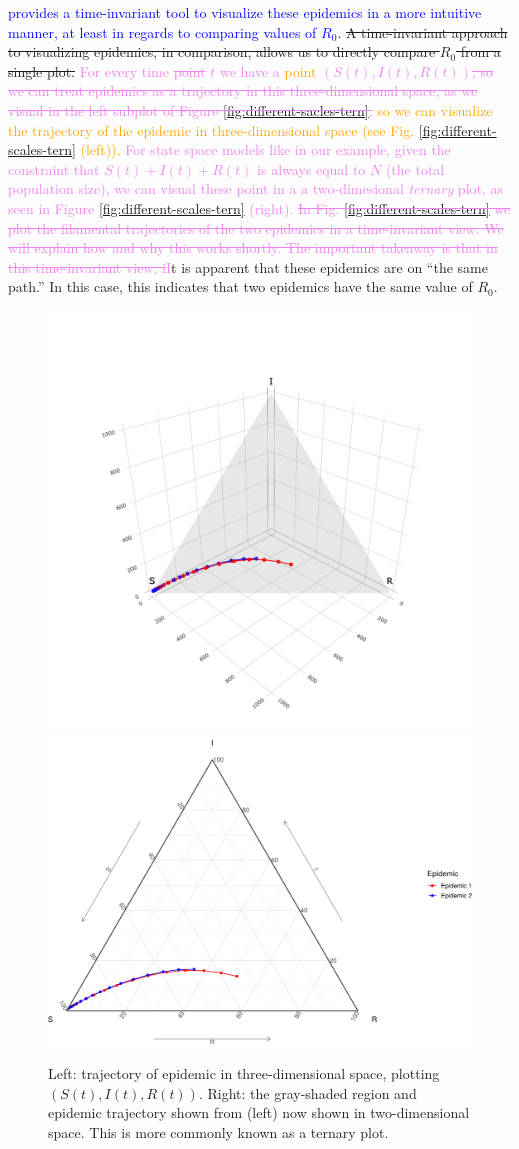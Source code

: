 \documentclass[
  shortnames]{jss}
\begin{document}
\textcolor{blue}{ provides a time-invariant tool to visualize these epidemics in a more intuitive manner, at least in regards to comparing values of $R_0$.}
\sout{A time-invariant approach to visualizing epidemics, in comparison, allows us to directly compare $R_0$ from a single plot.}
\textcolor{violet}{For every time \sout{point} $t$ we have a \textcolor{orange}{point} $(S(t),I(t), R(t))$\sout{, so we can treat epidemics as a trajectory in this three-dimensional space, as we visual in the left subplot of Figure \ref{fig:different-sacles-tern}.} \textcolor{orange}{so we can visualize the trajectory of the epidemic in three-dimensional space (see Fig. \ref{fig:different-scales-tern} (left)).} For state space models like in our example, given the constraint that $S(t) + I(t)+R(t)$ is always equal to $N$ (the total population size), we can visual these point in a a two-dimesional \textit{ternary} plot, as seen in Figure \ref{fig:different-scales-tern} (right). \sout{In Fig. \ref{fig:different-scales-tern}
we plot the filamental trajectories of the two epidemics in a time-invariant view. We will explain how and why this works shortly. The important takeaway is that in this time-invariant view, i}I}t
is apparent that these epidemics are on ``the same path.'' In this case,
this indicates that two epidemics have the same value of \(R_0\).

\begin{CodeChunk}
\begin{figure}[H]

{\centering \includegraphics[width=0.49\linewidth]{images/vis3d} \includegraphics[width=0.49\linewidth]{Figs/unnamed-chunk-3-2} 

}

\caption{\label{fig:different-scales-tern}Left: trajectory of epidemic in three-dimensional space, plotting $(S(t), I(t), R(t))$.  Right: the gray-shaded region and epidemic trajectory shown from (left) now shown in two-dimensional space.  This is more commonly known as a ternary plot.}\label{fig:unnamed-chunk-3}
\end{figure}
\end{CodeChunk}
\end{document}

